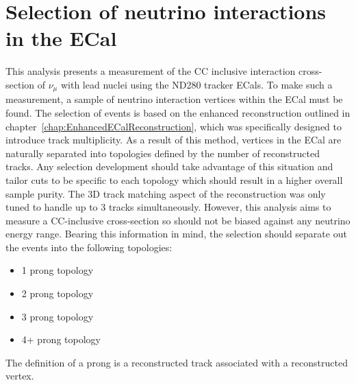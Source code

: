 


\chapter{Selection of neutrino interactions in the ECal}
\label{chap:NeutrinoInteractionSelection}
This analysis presents a measurement of the CC inclusive interaction cross-section of $\nu_\mu$ with lead nuclei using the ND280 tracker ECals.  To make such a measurement, a sample of neutrino interaction vertices within the ECal must be found.  The selection of events is based on the enhanced reconstruction outlined in chapter~\ref{chap:EnhancedECalReconstruction}, which was specifically designed to introduce track multiplicity.  As a result of this method, vertices in the ECal are naturally separated into topologies defined by the number of reconstructed tracks.  Any selection development should take advantage of this situation and tailor cuts to be specific to each topology which should result in a higher overall sample purity.  The 3D track matching aspect of the reconstruction was only tuned to handle up to 3 tracks simultaneously.  However, this analysis aims to measure a CC-inclusive cross-section so should not be biased against any neutrino energy range.  Bearing this information in mind, the selection should separate out the events into the following topologies:
\begin{itemize}
  \item 1 prong topology
  \item 2 prong topology
  \item 3 prong topology
  \item 4+ prong topology
\end{itemize}
The definition of a prong is a reconstructed track associated with a reconstructed vertex.
\newline
\newline
